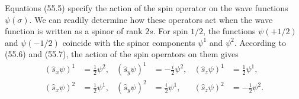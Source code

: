 Equations (55.5) specify the action of the spin operator on the wave functions
$\psi(\sigma)$. We can readily determine how these operators act when the wave
function is written as a spinor of rank $2s$. For spin $1/2$, the functions
$\psi(+1/2)$ and $\psi(-1/2)$ coincide with the spinor components $\psi^1$ and
$\psi^2$. According to (55.6) and (55.7), the action of the spin operators on
them gives
\begin{equation}
 \begin{aligned}
 (\hat s_x\psi)^1&=\tfrac12\psi^2,&
 (\hat s_y\psi)^1&=-\tfrac i2\psi^2,&
 (\hat s_z\psi)^1&=\tfrac12\psi^1,\\
 (\hat s_x\psi)^2&=\tfrac12\psi^1,&
 (\hat s_y\psi)^2&=\tfrac i2\psi^1,&
 (\hat s_z\psi)^2&=-\tfrac12\psi^2.
 \end{aligned}
 \tag{57.4}
\end{equation}
